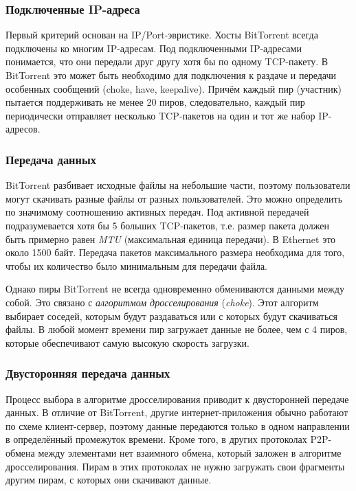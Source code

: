 \documentclass[bachelor, och, coursework]{SCWorks}
\begin{document}
\subsubsection{Подключенные IP-адреса}
Первый критерий основан на IP/Port-эвристике. Хосты BitTorrent всегда подключены ко многим IP-адресам.
Под подключенными IP-адресами понимается, что они передали друг другу хотя бы
по одному TCP-пакету. В BitTorrent это может быть необходимо для подключения к раздаче и передачи особенных
сообщений (choke, have, keepalive). Причём каждый пир (участник) пытается поддерживать не менее 20 пиров, следовательно,
каждый пир периодически отправляет несколько TCP-пакетов на один и тот же набор IP-адресов.

\subsubsection{Передача данных}
BitTorrent разбивает исходные файлы на небольшие части, поэтому пользователи могут скачивать разные файлы
от разных пользователей. Это можно определить по значимому соотношению активных передач. Под активной передачей
подразумевается хотя бы 5 больших TCP-пакетов, т.е. размер пакета должен быть примерно равен \textit{MTU} (максимальная единица передачи). В Ethernet это около 1500 байт. Передача пакетов максимального размера необходима для того, 
чтобы их количество было минимальным для передачи файла.

Однако пиры BitTorrent не всегда одновременно обмениваются данными между собой. 
Это связано с \textit{алгоритмом дросселирования} (\textit{choke}). Этот алгоритм выбирает соседей, которым будут раздаваться или с которых будут скачиваться файлы. В любой момент времени пир загружает данные не более, чем 
с 4 пиров, которые обеспечивают самую высокую скорость загрузки. %
 
\subsubsection{Двусторонняя передача данных}
Процесс выбора в алгоритме дросселирования приводит к двусторонней передаче данных. В отличие от BitTorrent, другие 
интернет-приложения обычно работают по схеме клиент-сервер, поэтому данные передаются только в одном направлении в 
определённый промежуток времени. Кроме того, в других протоколах P2P-обмена между элементами нет взаимного обмена,
который заложен в алгоритме дросселирования. Пирам в этих протоколах не нужно загружать свои фрагменты другим пирам,
с которых они скачивают данные. 
\end{document}
